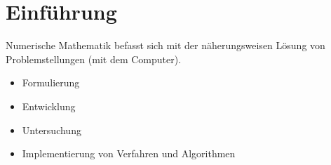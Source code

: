 \section{Einführung}

Numerische Mathematik befasst sich mit der näherungsweisen Lösung von Problemstellungen (mit dem Computer).
\begin{itemize}
  \item Formulierung
  \item Entwicklung
  \item Untersuchung
  \item Implementierung
    von Verfahren und Algorithmen
\end{itemize}

